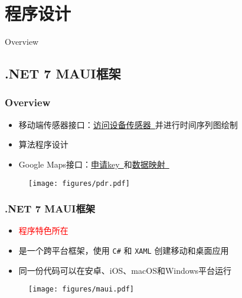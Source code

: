 \documentclass[10pt,xcolor=dvipsnames,fontset=none,punct=CCT]{ctexbeamer}
\begin{document}
\section{程序设计}
\begin{frame}{Overview}
\end{frame}

\subsection{.NET 7 MAUI框架}
\begin{frame}
  \frametitle{Overview}
  \begin{itemize}
    \item 移动端传感器接口：\href{https://learn.microsoft.com/zh-cn/dotnet/maui/platform-integration/device/sensors?view=net-maui-7.0\&tabs=android\#orientation}{访问设备传感器\ \faWindows}并进行时间序列图绘制
    \item 算法程序设计
    \item Google Maps接口：\href{https://developers.google.com/maps/documentation/android-sdk/get-api-key?hl=zh-cn}{申请key\ \faGoogle}和\href{https://learn.microsoft.com/zh-cn/dotnet/maui/user-interface/controls/map?view=net-maui-7.0}{数据映射\ \faWindows}
  \end{itemize}
  \begin{figure}[ht]
    \centering
    \texttt{[image: figures/pdr.pdf]}
  \end{figure}
\end{frame}

\begin{frame}[fragile]
  \frametitle{.NET 7 MAUI框架}
  \begin{itemize}
    \item \textcolor{red}{程序特色所在}
    \item 是一个跨平台框架，使用 \texttt{C#} 和 \texttt{XAML} 创建移动和桌面应用
    \item 同一份代码可以在安卓、iOS、macOS和Windows平台运行
  \end{itemize}
  \begin{figure}
    \centering
    \texttt{[image: figures/maui.pdf]}
  \end{figure}
\end{frame}
\end{document}
